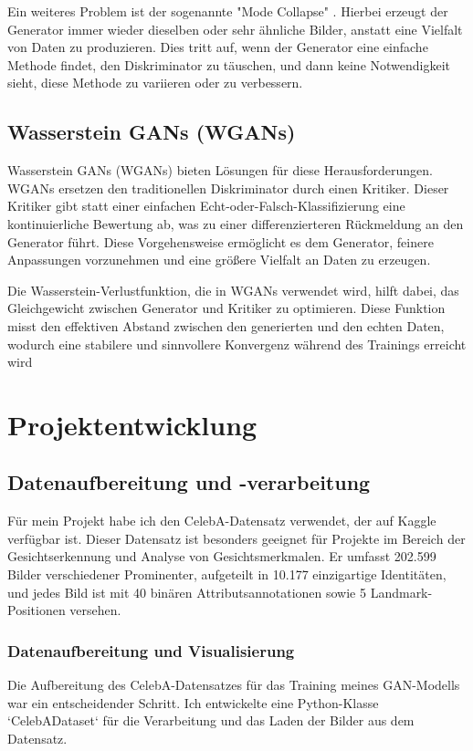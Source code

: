 \documentclass[a4paper, 12pt]{article}
\begin{document}
Ein weiteres Problem ist der sogenannte "Mode Collapse" \cite{mathworks_gan_training}. Hierbei erzeugt der Generator immer wieder dieselben oder sehr ähnliche Bilder, anstatt eine Vielfalt von Daten zu produzieren. Dies tritt auf, wenn der Generator eine einfache Methode findet, den Diskriminator zu täuschen, und dann keine Notwendigkeit sieht, diese Methode zu variieren oder zu verbessern.


\subsection{Wasserstein GANs (WGANs)}
Wasserstein GANs (WGANs) bieten Lösungen für diese Herausforderungen\cite{ar5iv_dynamic_discriminator}\cite{ar5iv_contrastive_discriminator}. WGANs ersetzen den traditionellen Diskriminator durch einen Kritiker. Dieser Kritiker gibt statt einer einfachen Echt-oder-Falsch-Klassifizierung eine kontinuierliche Bewertung ab, was zu einer differenzierteren Rückmeldung an den Generator führt. Diese Vorgehensweise ermöglicht es dem Generator, feinere Anpassungen vorzunehmen und eine größere Vielfalt an Daten zu erzeugen.

Die Wasserstein-Verlustfunktion, die in WGANs verwendet wird, hilft dabei, das Gleichgewicht zwischen Generator und Kritiker zu optimieren. Diese Funktion misst den effektiven Abstand zwischen den generierten und den echten Daten, wodurch eine stabilere und sinnvollere Konvergenz während des Trainings erreicht wird



\section{Projektentwicklung}
\subsection{Datenaufbereitung und -verarbeitung}

Für mein Projekt habe ich den CelebA-Datensatz verwendet, der auf Kaggle verfügbar ist. Dieser Datensatz ist besonders geeignet für Projekte im Bereich der Gesichtserkennung und Analyse von Gesichtsmerkmalen. Er umfasst 202.599 Bilder verschiedener Prominenter, aufgeteilt in 10.177 einzigartige Identitäten, und jedes Bild ist mit 40 binären Attributsannotationen sowie 5 Landmark-Positionen versehen.

\subsubsection{Datenaufbereitung und Visualisierung}
Die Aufbereitung des CelebA-Datensatzes für das Training meines GAN-Modells war ein entscheidender Schritt. Ich entwickelte eine Python-Klasse `CelebADataset` für die Verarbeitung und das Laden der Bilder aus dem Datensatz.
\end{document}
